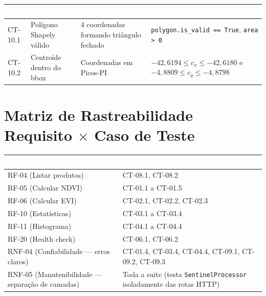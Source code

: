 \documentclass[11pt, a4paper]{article}
\begin{document}
\begin{table}[H]
\centering
\footnotesize
{}
\begin{tabularx}{\textwidth}{@{}p{1.5cm}p{4.5cm}p{3.5cm}X@{}}
\toprule
\rowcolor{tabheader}\textcolor{white}{\textbf{ID}} & \textcolor{white}{\textbf{Caso}} & \textcolor{white}{\textbf{Entrada}} & \textcolor{white}{\textbf{Resultado Esperado}}\\
\midrule
CT-10.1 & Polígono Shapely válido & 4 coordenadas formando triângulo fechado & \texttt{polygon.is\_valid == True}, \texttt{area > 0}\\
CT-10.2 & Centroide dentro do bbox & Coordenadas em Picos-PI & $-42{,}6194 \leq c_x \leq -42{,}6180$ e $-4{,}8809 \leq c_y \leq -4{,}8798$\\
\bottomrule
\end{tabularx}
\end{table}

\section{Matriz de Rastreabilidade Requisito $\times$ Caso de Teste}

\begin{table}[H]
\centering
\small
{}
\begin{tabularx}{\textwidth}{@{}lX@{}}
\toprule
\rowcolor{tabheader}\textcolor{white}{\textbf{Requisito (SRS)}} & \textcolor{white}{\textbf{Casos de Teste}}\\
\midrule
RF-04 (Listar produtos) & CT-08.1, CT-08.2\\
RF-05 (Calcular NDVI) & CT-01.1 a CT-01.5\\
RF-06 (Calcular EVI) & CT-02.1, CT-02.2, CT-02.3\\
RF-10 (Estatísticas) & CT-03.1 a CT-03.4\\
RF-11 (Histograma) & CT-04.1 a CT-04.4\\
RF-20 (Health check) & CT-06.1, CT-06.2\\
RNF-04 (Confiabilidade --- erros claros) & CT-01.4, CT-03.4, CT-04.4, CT-09.1, CT-09.2, CT-09.3\\
RNF-05 (Manutenibilidade --- separação de camadas) & Toda a suite (testa \texttt{SentinelProcessor} isoladamente das rotas HTTP)\\
\bottomrule
\end{tabularx}
\end{table}
\end{document}
